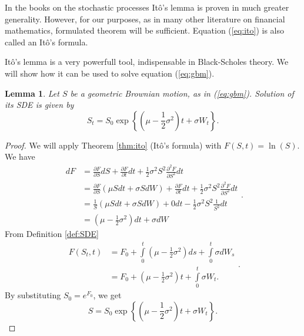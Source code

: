 \documentclass[a4paper,12pt, oneside]{book}
\newtheorem{lemma}[thm]{Lemma}
\theoremstyle{definition}
\theoremstyle{remark}
\begin{document}
\noindent In the books on the stochastic processes It\^{o}'s lemma is proven in much greater generality. However, for our purposes, as in many other literature on financial mathematics, formulated theorem will be sufficient. Equation (\ref{eq:ito}) is also called an It\^{o}'s formula.

It\^{o}'s lemma is a very powerfull tool, indispensable in Black-Scholes theory. We will show how it can be used to solve equation (\ref{eq:gbm}).
\begin{lemma}
\label{lemma:solution_dynamics}
 Let $S$ be a geometric Brownian motion, as in (\ref{eq:gbm}).
 Solution of its SDE is given by
 \begin{equation}
  \label{eq:gmb_sol}
  S_t = S_0 \exp\left\{ (\mu - \frac{1}{2}\sigma^2)t + \sigma W_t \right\}.
 \end{equation}
\end{lemma}
\begin{proof}
We will apply Theorem \ref{thm:ito} (It\^{o}'s formula) with $F(S,t) = \ln(S)$. We have
 \begin{equation*}
  \begin{split}
   dF &= \frac{\partial F}{\partial S}dS + \frac{\partial F}{\partial t}dt + \frac{1}{2}\sigma^2 S^2 \frac{\partial^2 F}{\partial S^2}dt \\
   &= \frac{\partial F}{\partial S}(\mu S dt + \sigma S dW) + \frac{\partial F}{\partial t}dt + \frac{1}{2}\sigma^2 S^2 \frac{\partial^2 F}{\partial S^2}dt \\    
   &= \frac{1}{S}(\mu S dt + \sigma S dW) + 0dt - \frac{1}{2}\sigma^2 S^2 \frac{1}{S^2}dt \\   
   &= (\mu - \frac{1}{2}\sigma^2) dt + \sigma dW
  \end{split}.
 \end{equation*}
 From Definition \ref{def:SDE}
 \begin{equation*}
  \begin{split}
  F(S_t,t) &= F_0 + \int\limits_0^t (\mu - \frac{1}{2}\sigma^2) ds + \int\limits_0^t \sigma dW_s\\
  &= F_0 + (\mu - \frac{1}{2}\sigma^2)t + \int\limits_0^t \sigma W_t. 
  \end{split}.
 \end{equation*}
 By substituting $S_0 = e^{F_0}$, we get
 \[ S = S_0 \exp\left\{ (\mu - \frac{1}{2}\sigma^2)t + \sigma W_t \right\}. \] 
\end{proof}
\end{document}
